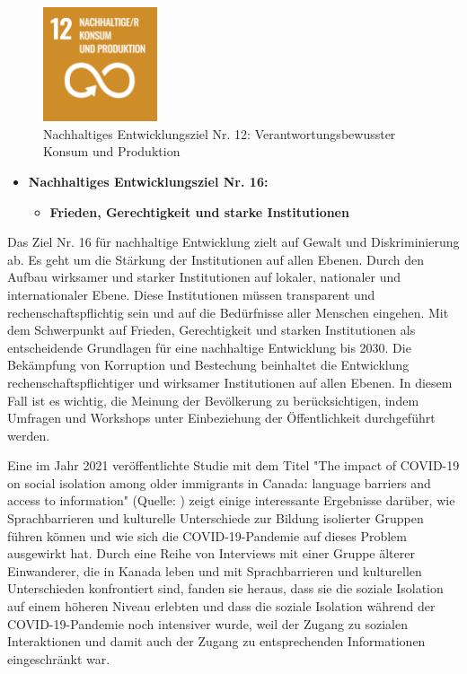 \begin{figure}[H]
    \centering
    \includegraphics[width=0.3\textwidth]{pics/SDG-12.png}
    \caption{Nachhaltiges Entwicklungsziel Nr. 12: Verantwortungsbewusster Konsum und Produktion}
    \label{fig:SDG12}
\end{figure}

\begin{itemize}
    \item \textbf{Nachhaltiges Entwicklungsziel Nr. 16: }
          \begin{itemize}
              \item \textbf{Frieden, Gerechtigkeit und starke Institutionen}
          \end{itemize}
\end{itemize}

Das Ziel Nr. 16 für nachhaltige Entwicklung zielt auf Gewalt und Diskriminierung ab. Es geht um die Stärkung der Institutionen auf allen Ebenen. Durch den Aufbau wirksamer und starker Institutionen auf lokaler, nationaler und internationaler Ebene. Diese Institutionen müssen transparent und rechenschaftspflichtig sein und auf die Bedürfnisse aller Menschen eingehen. Mit dem Schwerpunkt auf Frieden, Gerechtigkeit und starken Institutionen als entscheidende Grundlagen für eine nachhaltige Entwicklung bis 2030. Die Bekämpfung von Korruption und Bestechung beinhaltet die Entwicklung rechenschaftspflichtiger und wirksamer Institutionen auf allen Ebenen. In diesem Fall ist es wichtig, die Meinung der Bevölkerung zu berücksichtigen, indem Umfragen und Workshops unter Einbeziehung der Öffentlichkeit durchgeführt werden.

Eine im Jahr 2021 veröffentlichte Studie mit dem Titel "The impact of COVID-19 on social isolation among older immigrants in Canada: language barriers and access to information" (Quelle: ) zeigt einige interessante Ergebnisse darüber, wie Sprachbarrieren und kulturelle Unterschiede zur Bildung isolierter Gruppen führen können und wie sich die COVID-19-Pandemie auf dieses Problem ausgewirkt hat. Durch eine Reihe von Interviews mit einer Gruppe älterer Einwanderer, die in Kanada leben und mit Sprachbarrieren und kulturellen Unterschieden konfrontiert sind, fanden sie heraus, dass sie die soziale Isolation auf einem höheren Niveau erlebten und dass die soziale Isolation während der COVID-19-Pandemie noch intensiver wurde, weil der Zugang zu sozialen Interaktionen und damit auch der Zugang zu entsprechenden Informationen eingeschränkt war.

